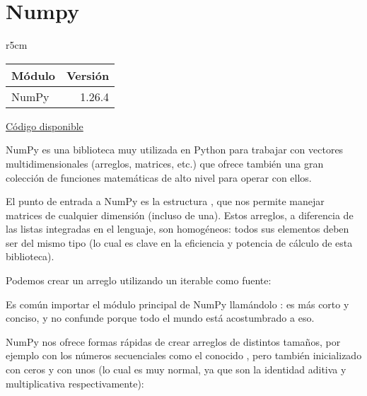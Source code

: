 

\chapter{Numpy} \label{ch:numpy}

\begin{wraptable}{r}{5cm}
\begin{modulesinfo}
\begin{center}
{\small
    \begin{tabular}{l r}
        \toprule
        \textbf{Módulo} & \textbf{Versión} \\
        \midrule
        NumPy & 1.26.4 \\
        \bottomrule
    \end{tabular}
    \vspace{0.75em}

    \href{https://github.com/facundobatista/libro-pyciencia/tree/master/código/numpy/}{Código disponible}
}
\end{center}
\end{modulesinfo}
\end{wraptable}

NumPy es una biblioteca muy utilizada en Python para trabajar con vectores multidimensionales (arreglos, matrices, etc.) que ofrece también una gran colección de funciones matemáticas de alto nivel para operar con ellos.

El punto de entrada a NumPy es la estructura , que nos permite manejar matrices de cualquier dimensión (incluso de una). Estos arreglos, a diferencia de las listas integradas en el lenguaje, son homogéneos: todos sus elementos deben ser del mismo tipo (lo cual es clave en la eficiencia y potencia de cálculo de esta biblioteca).

Podemos crear un arreglo utilizando un iterable como fuente:


\begin{info}
Es común importar el módulo principal de NumPy llamándolo : es más corto y conciso, y no confunde porque todo el mundo está acostumbrado a eso.
\end{info}

NumPy nos ofrece formas rápidas de crear arreglos de distintos tamaños, por ejemplo con los números secuenciales como el conocido , pero también inicializado con ceros y con unos (lo cual es muy normal, ya que son la identidad aditiva y multiplicativa respectivamente):

